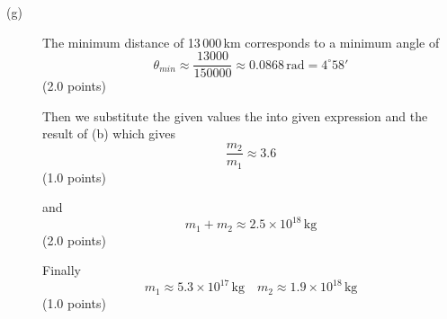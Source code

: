 \begin{description}
\item[(g)] The minimum distance of 13\,000\,km corresponds to a minimum angle
  of
  \[
    \theta_{min} \approx \frac{13000}{150000}
      \approx 0.0868\,\mathrm{rad} = 4^\circ 58'
  \]
  \hfill(2.0 points)

  Then we substitute the given values the into given expression and the result %
  of (b) which gives
  \[
    \frac{m_2}{m_1} \approx 3.6
  \]
  \hfill(1.0 points)

  and
  \[
    m_1 + m_2 \approx 2.5\times10^{18}\,\mathrm{kg}
  \]
  \hfill(2.0 points)

  Finally
  \[
    m_1 \approx 5.3\times10^{17}\,\mathrm{kg} \quad
    m_2 \approx 1.9\times10^{18}\,\mathrm{kg}
  \]
  \hfill(1.0 points)
\end{description}

